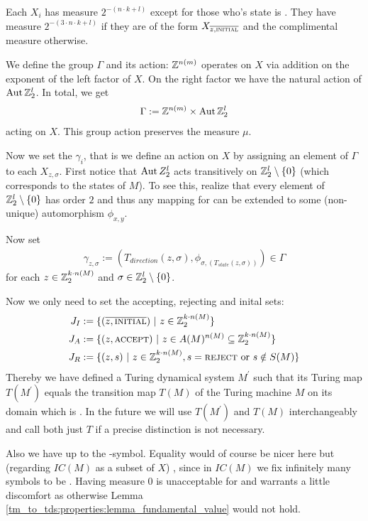 \begin{Remark}
	Each $X_i$ has measure $2^{-(n \cdot k+l)}$ except for those who's state is \INI.
	They have measure $2^{-(3 \cdot n \cdot k+l)}$ if they are of the form $X_{\overline{z,\text{\scshape{initial}}}}$ and the complimental measure otherwise.
\end{Remark}

We define the group $\Gamma$ and its action:
$\mathbb{Z}^{n(m)}$ operates on $X$ via addition on the exponent of the left factor of $X$.
On the right factor we have the natural action of $\operatorname{Aut} \mathbb{Z}_2^l$.
In total, we get
\begin{align*}
	\Gamma := \mathbb{Z}^{n(m)} \times \operatorname{Aut} \mathbb{Z}_2^l
\end{align*}
acting on $X$.
This group action preserves the measure $\mu$.

Now we set the $\gamma_i$, that is we define an action on $X$ by assigning an element of $\Gamma$ to each $X_{z,\sigma}$.
First notice that
$\operatorname{Aut} Z_2^l$ acts transitively on $\mathbb{Z}_2^l \setminus \{0\}$ (which corresponds to the states of $M$).
To see this, realize that every element of $\mathbb{Z}_2^l \setminus \{0\}$ has order $2$ and thus any mapping  for  can be extended to some (non-unique) automorphism $\phi_{x,y}$.

Now set
\begin{align*}
	\gamma_{z,\sigma} := (T_{direction}(z,\sigma) , \phi_{\sigma,(T_{state}(z,\sigma))}) \in \Gamma
\end{align*}
for each $z \in \mathbb{Z}_2^{k \cdot n(M)}$ and $\sigma \in \mathbb{Z}_2^l \setminus \{0\}$.

Now we only need to set the accepting, rejecting and inital sets:
\begin{align*}
	J_I & := \{(\overline{z,\text{\scshape{initial}}}) ~\vert~ z \in \mathbb{Z}_2^{k \cdot n(M)} \} \\
	J_A & := \{(z,\text{\scshape{accept}}) ~\vert~ z \in A(M)^{n(M)} \subseteq \mathbb{Z}_2^{k \cdot n(M)} \} \\
	J_R & := \{(z,s) ~\vert~ z \in \mathbb{Z}_2^{k \cdot n(M)} , s = \text{\scshape{reject}} ~\text{or}~ s \notin S(M) \} \\
\end{align*}
Thereby we have defined a Turing dynamical system $M^\prime$ such that its Turing map $T(M^\prime)$ equals the transition map $T(M)$ of the Turing machine $M$ on its domain which is  .
In the future we will use $T(M^\prime)$ and $T(M)$ interchangeably and call both just $T$ if a precise distinction is not necessary.

Also we have  up to the \DELIM-symbol.
Equality would of course be nicer here but (regarding $IC(M)$ as a subset of $X$) , since in $IC(M)$ we fix infinitely many symbols to be \EMP.
Having measure $0$ is unacceptable for  and warrants a little discomfort as otherwise Lemma \ref{tm_to_tds:properties:lemma_fundamental_value} would not hold. 
